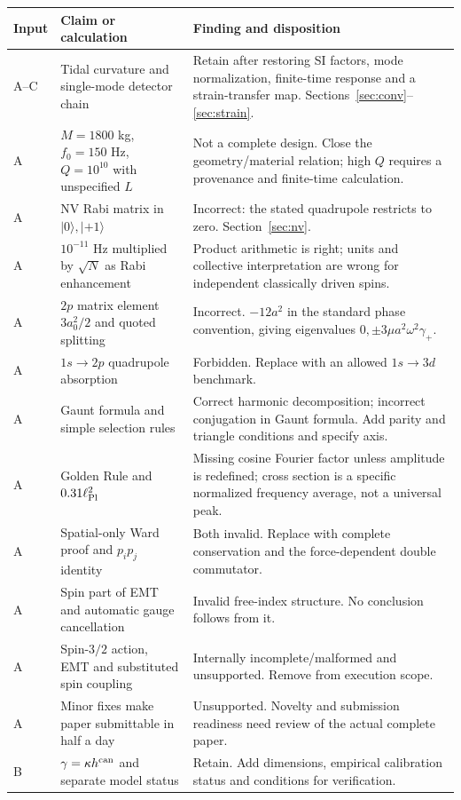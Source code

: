 \documentclass[a4paper,11pt]{article}
\newcommand{\ket}[1]{\lvert #1\rangle}
\begin{document}
\begin{longtable}{@{}P{10mm}P{54mm}P{89mm}@{}}\toprule
Input & Claim or calculation & Finding and disposition\\\midrule\endhead
A--C & Tidal curvature and single-mode detector chain & Retain after restoring SI factors, mode normalization, finite-time response and a strain-transfer map. Sections~\ref{sec:conv}--\ref{sec:strain}.\\
A & $M=1800$ kg, $f_0=150$ Hz, $Q=10^{10}$ with unspecified $L$ & Not a complete design. Close the geometry/material relation; high $Q$ requires a provenance and finite-time calculation.\\
A & NV Rabi matrix in $\ket0,\ket{+1}$ & Incorrect: the stated quadrupole restricts to zero. Section~\ref{sec:nv}.\\
A & $10^{-11}$ Hz multiplied by $\sqrt N$ as Rabi enhancement & Product arithmetic is right; units and collective interpretation are wrong for independent classically driven spins.\\
A & $2p$ matrix element $3a_0^2/2$ and quoted splitting & Incorrect. $-12a^2$ in the standard phase convention, giving eigenvalues $0,\pm3\mu a^2\omega^2\gamma_+$.\\
A & $1s\to2p$ quadrupole absorption & Forbidden. Replace with an allowed $1s\to3d$ benchmark.\\
A & Gaunt formula and simple selection rules & Correct harmonic decomposition; incorrect conjugation in Gaunt formula. Add parity and triangle conditions and specify axis.\\
A & Golden Rule and $0.31\ell_{\rm Pl}^2$ & Missing cosine Fourier factor unless amplitude is redefined; cross section is a specific normalized frequency average, not a universal peak.\\
A & Spatial-only Ward proof and $p_ip_j$ identity & Both invalid. Replace with complete conservation and the force-dependent double commutator.\\
A & Spin part of EMT and automatic gauge cancellation & Invalid free-index structure. No conclusion follows from it.\\
A & Spin-$3/2$ action, EMT and substituted spin coupling & Internally incomplete/malformed and unsupported. Remove from execution scope.\\
A & Minor fixes make paper submittable in half a day & Unsupported. Novelty and submission readiness need review of the actual complete paper.\\
B & $\gamma=\kappa h^{\rm can}$ and separate model status & Retain. Add dimensions, empirical calibration status and conditions for verification.\\

\end{longtable}
\end{document}
